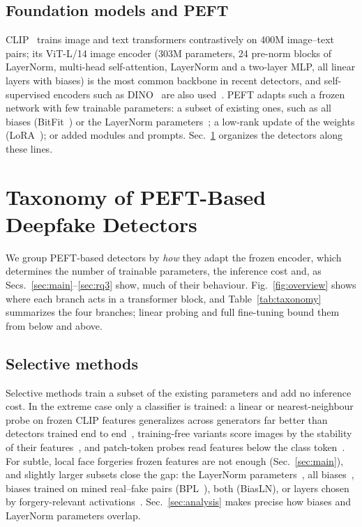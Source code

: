 \documentclass[fonts]{icst}
\begin{document}
\subsection{Foundation models and PEFT}
CLIP~\cite{radford2021clip_vitl} trains image and text transformers contrastively on 400M image--text pairs; its ViT-L/14 image encoder (303M parameters, 24 pre-norm blocks of LayerNorm, multi-head self-attention, LayerNorm and a two-layer MLP, all linear layers with biases) is the most common backbone in recent detectors, and self-supervised encoders such as DINO~\cite{caron2021emerging} are also used~\cite{zhang2026dino,zou2026clipdino}. PEFT adapts such a frozen network with few trainable parameters: a subset of existing ones, such as all biases (BitFit~\cite{benzaken2022bitfit}) or the LayerNorm parameters~\cite{wang2022ln,giannou2023layernorm,valizadeh2024layernorm}; a low-rank update of the weights (LoRA~\cite{hu2022lora}); or added modules and prompts. Sec.~\ref{sec:taxonomy} organizes the detectors along these lines.

\section{Taxonomy of PEFT-Based Deepfake Detectors}
\label{sec:taxonomy}

We group PEFT-based detectors by \emph{how} they adapt the frozen encoder, which determines the number of trainable parameters, the inference cost and, as Secs.~\ref{sec:main}--\ref{sec:rq3} show, much of their behaviour. Fig.~\ref{fig:overview} shows where each branch acts in a transformer block, and Table~\ref{tab:taxonomy} summarizes the four branches; linear probing and full fine-tuning bound them from below and above.



\subsection{Selective methods}
Selective methods train a subset of the existing parameters and add no inference cost. In the extreme case only a classifier is trained: a linear or nearest-neighbour probe on frozen CLIP features generalizes across generators far better than detectors trained end to end~\cite{ojha2023universal}, training-free variants score images by the stability of their features~\cite{tsai2024trainingfree}, and patch-token probes read features below the class token~\cite{abdullah2026tap}. For subtle, local face forgeries frozen features are not enough (Sec.~\ref{sec:main}), and slightly larger subsets close the gap: the LayerNorm parameters~\cite{yermakov2025clip,yermakov2025gend}, all biases~\cite{benzaken2022bitfit}, biases trained on mined real--fake pairs (BPL~\cite{xu2026bpl}), both (BiasLN), or layers chosen by forgery-relevant activations~\cite{zhang2026layermask}. Sec.~\ref{sec:analysis} makes precise how biases and LayerNorm parameters overlap.
\end{document}
